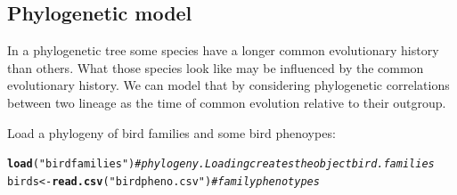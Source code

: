 \documentclass[12pt,a4paper]{scrartcl}\usepackage[]{graphicx}\usepackage[]{color}
\makeatletter
\newcommand{\hlstr}[1]{\textcolor[rgb]{0.192,0.494,0.8}{#1}}%
\newcommand{\hlcom}[1]{\textcolor[rgb]{0.678,0.584,0.686}{\textit{#1}}}%
\newcommand{\hlstd}[1]{\textcolor[rgb]{0.345,0.345,0.345}{#1}}%
\newcommand{\hlkwb}[1]{\textcolor[rgb]{0.69,0.353,0.396}{#1}}%
\newcommand{\hlkwd}[1]{\textcolor[rgb]{0.737,0.353,0.396}{\textbf{#1}}}%
\newenvironment{kframe}{%
 \def\at@end@of@kframe{}%
 \ifinner\ifhmode%
  \def\at@end@of@kframe{\end{minipage}}%
  \begin{minipage}{\columnwidth}%
 \fi\fi%
 \def\FrameCommand##1{\hskip\@totalleftmargin \hskip-\fboxsep
 \colorbox{shadecolor}{##1}\hskip-\fboxsep
     \hskip-\linewidth \hskip-\@totalleftmargin \hskip\columnwidth}%
 \MakeFramed {\advance\hsize-\width
   \@totalleftmargin\z@ \linewidth\hsize
   \@setminipage}}%
 {\par\unskip\endMakeFramed%
 \at@end@of@kframe}
\newenvironment{knitrout}{}{} %
\makeatother
\begin{document}
\subsection{Phylogenetic model}

In a phylogenetic tree some species have a longer common evolutionary history than others. What those species look like may be influenced by the common evolutionary history. We can model that by considering phylogenetic correlations between two lineage as the time of common evolution relative to their outgroup. 


\begin{Exercise}[difficulty=1, title={Demo of Phylogeny and correlated phenotypes}]
Load a phylogeny of bird families and some bird phenoypes:
\begin{knitrout}
\color{fgcolor}\begin{kframe}
\begin{alltt}
\hlkwd{load}\hlstd{(}\hlstr{"birdfamilies"}\hlstd{)} \hlcom{#phylogeny. Loading creates the object bird.families}
\hlstd{birds} \hlkwb{<-} \hlkwd{read.csv}\hlstd{(}\hlstr{"birdpheno.csv"}\hlstd{)} \hlcom{#family phenotypes}
\end{alltt}
\end{kframe}
\end{knitrout}


\end{Exercise}
\end{document}
